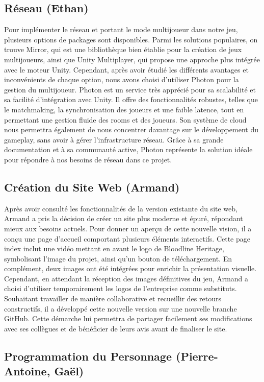 \documentclass{report}
\begin{document}
\subsection*{Réseau (Ethan)}
Pour implémenter le réseau et portant le mode multijoueur dans notre jeu, plusieurs options de packages sont disponibles. Parmi les solutions populaires, on trouve Mirror, qui est une bibliothèque bien établie pour la création de jeux multijoueurs, ainsi que Unity Multiplayer, qui propose une approche plus intégrée avec le moteur Unity. Cependant, après avoir étudié les différents avantages et inconvénients de chaque option, nous avons choisi d'utiliser Photon pour la gestion du multijoueur. Photon est un service très apprécié pour sa scalabilité et sa facilité d'intégration avec Unity. Il offre des fonctionnalités robustes, telles que le matchmaking, la synchronisation des joueurs et une faible latence, tout en permettant une gestion fluide des rooms et des joueurs. Son système de cloud nous permettra également de nous concentrer davantage sur le développement du gameplay, sans avoir à gérer l'infrastructure réseau. Grâce à sa grande documentation et à sa communauté active, Photon représente la solution idéale pour répondre à nos besoins de réseau dans ce projet.

\subsection*{Création du Site Web (Armand)}
Après avoir consulté les fonctionnalités de la version existante du site web, Armand a pris la décision de créer un site plus moderne et épuré, répondant mieux aux besoins actuels. Pour donner un aperçu de cette nouvelle vision, il a conçu une page d'accueil comportant plusieurs éléments interactifs. Cette page index inclut une vidéo mettant en avant le logo de Bloodline Heritage, symbolisant l'image du projet, ainsi qu'un bouton de téléchargement. En complément, deux images ont été intégrées pour enrichir la présentation visuelle. Cependant, en attendant la réception des images définitives du jeu, Armand a choisi d'utiliser temporairement les logos de l'entreprise comme substituts. Souhaitant travailler de manière collaborative et recueillir des retours constructifs, il a développé cette nouvelle version sur une nouvelle branche GitHub. Cette démarche lui permettra de partager facilement ses modifications avec ses collègues et de bénéficier de leurs avis avant de finaliser le site.

\subsection*{Programmation du Personnage (Pierre-Antoine, Gaël)}
\end{document}
